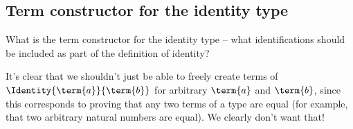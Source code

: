 %
%


\newpage
\subsection{Term constructor for the identity type}

What is the term constructor for the identity type -- what identifications should be included as part of the definition of identity?

It's clear that we shouldn't just be able to freely create terms of 
$\Identity{\term{a}}{\term{b}}$ for arbitrary $\term{a}$ and $\term{b}$,
since this corresponds to proving that any two terms of a type are equal
(for example, that two arbitrary natural numbers are equal).  We clearly don't want that!

